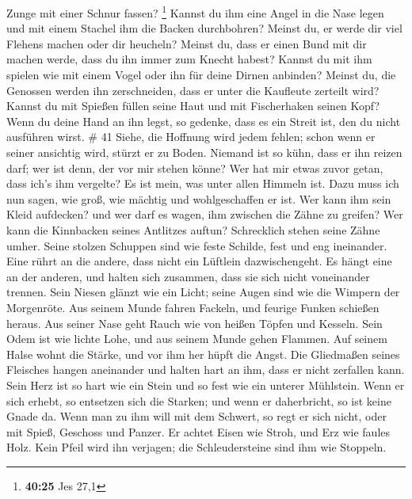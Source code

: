 Zunge mit einer Schnur fassen? \footnote{\textbf{40:25} Jes 27,1}
 Kannst du ihm eine Angel in die Nase legen und mit einem
Stachel ihm die Backen durchbohren?  Meinst du, er werde
dir viel Flehens machen oder dir heucheln?  Meinst du, dass
er einen Bund mit dir machen werde, dass du ihn immer zum Knecht habest?
 Kannst du mit ihm spielen wie mit einem Vogel oder ihn für
deine Dirnen anbinden?  Meinst du, die Genossen werden ihn
zerschneiden, dass er unter die Kaufleute zerteilt wird? 
Kannst du mit Spießen füllen seine Haut und mit Fischerhaken seinen
Kopf?  Wenn du deine Hand an ihn legst, so gedenke, dass es
ein Streit ist, den du nicht ausführen wirst. \# 41  Siehe,
die Hoffnung wird jedem fehlen; schon wenn er seiner ansichtig wird,
stürzt er zu Boden.  Niemand ist so kühn, dass er ihn reizen
darf; wer ist denn, der vor mir stehen könne?  Wer hat mir
etwas zuvor getan, dass ich's ihm vergelte? Es ist mein, was unter allen
Himmeln ist.  Dazu muss ich nun sagen, wie groß, wie mächtig
und wohlgeschaffen er ist.  Wer kann ihm sein Kleid
aufdecken? und wer darf es wagen, ihm zwischen die Zähne zu greifen?
 Wer kann die Kinnbacken seines Antlitzes auftun?
Schrecklich stehen seine Zähne umher.  Seine stolzen
Schuppen sind wie feste Schilde, fest und eng ineinander. 
Eine rührt an die andere, dass nicht ein Lüftlein dazwischengeht.
 Es hängt eine an der anderen, und halten sich zusammen,
dass sie sich nicht voneinander trennen.  Sein Niesen
glänzt wie ein Licht; seine Augen sind wie die Wimpern der Morgenröte.
 Aus seinem Munde fahren Fackeln, und feurige Funken
schießen heraus.  Aus seiner Nase geht Rauch wie von heißen
Töpfen und Kesseln.  Sein Odem ist wie lichte Lohe, und aus
seinem Munde gehen Flammen.  Auf seinem Halse wohnt die
Stärke, und vor ihm her hüpft die Angst.  Die Gliedmaßen
seines Fleisches hangen aneinander und halten hart an ihm, dass er nicht
zerfallen kann.  Sein Herz ist so hart wie ein Stein und so
fest wie ein unterer Mühlstein.  Wenn er sich erhebt, so
entsetzen sich die Starken; und wenn er daherbricht, so ist keine Gnade
da.  Wenn man zu ihm will mit dem Schwert, so regt er sich
nicht, oder mit Spieß, Geschoss und Panzer.  Er achtet
Eisen wie Stroh, und Erz wie faules Holz.  Kein Pfeil wird
ihn verjagen; die Schleudersteine sind ihm wie Stoppeln. 
